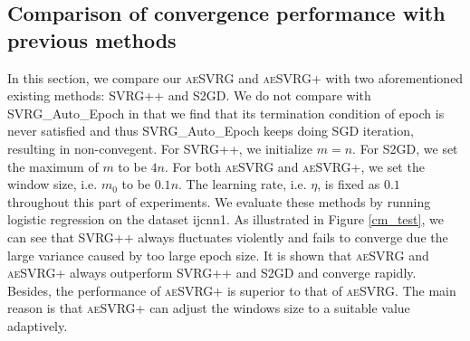 \documentclass[conference]{IEEEtran}
\begin{document}
\subsection{Comparison of convergence performance with previous methods}
In this section, we compare our \textsc{aeSVRG} and \textsc{aeSVRG+} with two aforementioned existing methods: SVRG++ and S2GD. We do not compare with SVRG\_Auto\_Epoch in that we find that its termination condition of epoch is never satisfied and  thus SVRG\_Auto\_Epoch keeps doing SGD iteration, resulting in non-convegent. For SVRG++, we initialize $m = n$. For S2GD, we set the maximum of $m$ to be $4n$. For both \textsc{aeSVRG} and \textsc{aeSVRG+}, we set the window size, i.e. $m_0$ to be $0.1n$. The learning rate, i.e. $\eta$, is fixed as $0.1$ throughout this part of experiments. We evaluate these methods by running logistic regression on the dataset ijcnn1. 
As illustrated in Figure \ref{cm_test}, we can see that SVRG++ always fluctuates violently and fails to converge due the large variance caused by too large epoch size. It is shown that \textsc{aeSVRG} and \textsc{aeSVRG+} always outperform SVRG++ and S2GD and converge rapidly. Besides, the performance of \textsc{aeSVRG+} is superior to that of \textsc{aeSVRG}. The main reason is that \textsc{aeSVRG+} can adjust the windows size to a suitable value adaptively.
\end{document}
